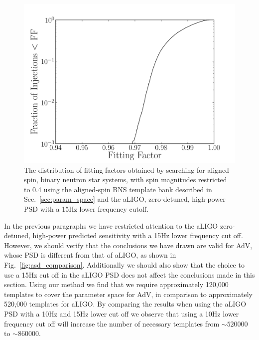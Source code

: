 \begin{figure}
\begin{center}
\includegraphics[width=1.0\textwidth]{papers/bns_spin/figure5.pdf}
\end{center}
\caption{\label{fig:anstar-aligned} The distribution of fitting factors obtained by searching
for aligned spin, binary neutron star systems, with spin magnitudes restricted to 0.4
using the aligned-spin BNS template bank described in Sec.~\ref{sec:param_space}
and the aLIGO, zero-detuned, high-power PSD with a 15Hz lower frequency cutoff.}
\end{figure}

In the previous paragraphs we have restricted attention to the aLIGO
zero-detuned, high-power predicted sensitivity with a 15Hz lower frequency cut off. However,
we should verify that the conclusions we have drawn are valid for AdV, whose
PSD is different from that of aLIGO, as shown in Fig.~\ref{fig:asd_comparison}. Additionally we
should also show that the choice to use a 15Hz cut off in the aLIGO PSD does not affect
the conclusions made in this section. Using our method we find that we require approximately 120,000 templates to cover the
parameter space for AdV, in comparison to approximately 520,000 templates for aLIGO. By comparing the results when using the aLIGO PSD with a 10Hz and 15Hz lower cut off we observe
that using a 10Hz lower frequency cut off will increase the number of necessary templates from $\sim520000$
to $\sim860000$. 

